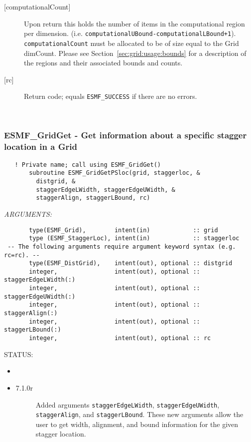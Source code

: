 \begin{description}
\begin{sloppypar}
       \end{sloppypar}
  \item[{[computationalCount]}]
       \begin{sloppypar}
       Upon return this holds the number of items in the computational region per dimension.
       (i.e. {\tt computationalUBound-computationalLBound+1}). {\tt computationalCount} must
        be allocated to be of size equal to the Grid dimCount.
       Please see Section~\ref{sec:grid:usage:bounds} for a description
       of the regions and their associated bounds and counts.
       \end{sloppypar}
  \item[{[rc]}]
       Return code; equals {\tt ESMF\_SUCCESS} if there are no errors.
  \end{description}
   
 
\mbox{}\hrulefill\ 
 

  \label{API:GridGetPSloc}\subsubsection [ESMF\_GridGet] {ESMF\_GridGet - Get information about a specific stagger location in a Grid}


 
\begin{verbatim}   ! Private name; call using ESMF_GridGet()
       subroutine ESMF_GridGetPSloc(grid, staggerloc, &
         distgrid, &
         staggerEdgeLWidth, staggerEdgeUWidth, &
         staggerAlign, staggerLBound, rc)
 \end{verbatim}{\em ARGUMENTS:}
\begin{verbatim}       type(ESMF_Grid),        intent(in)            :: grid
       type (ESMF_StaggerLoc), intent(in)            :: staggerloc
 -- The following arguments require argument keyword syntax (e.g. rc=rc). --
       type(ESMF_DistGrid),    intent(out), optional :: distgrid
       integer,                intent(out), optional :: staggerEdgeLWidth(:)
       integer,                intent(out), optional :: staggerEdgeUWidth(:)
       integer,                intent(out), optional :: staggerAlign(:)
       integer,                intent(out), optional :: staggerLBound(:)
       integer,                intent(out), optional :: rc\end{verbatim}
{\sf STATUS:}
   \begin{itemize}
   \item{}
   \item{}
   \begin{description}
   \item[7.1.0r] Added arguments {\tt staggerEdgeLWidth}, {\tt staggerEdgeUWidth},
                 {\tt staggerAlign}, and {\tt staggerLBound}. These new arguments 
                  allow the user to get width, alignment, and bound information for
                  the given stagger location. 
   \end{description}
   \end{itemize}
  

